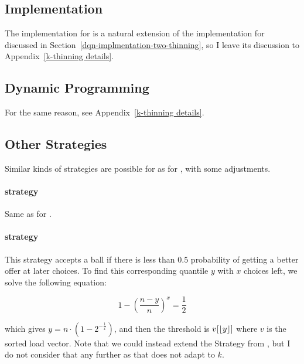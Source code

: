 \section{\KThinning}

\subsection{\DQL Implementation} \label{dqn-implementation-k-thinning}

The \DQL implementation for \KThinning is a natural extension of the implementation for \TwoThinning discussed in Section~\ref{dqn-implmentation-two-thinning}, so I leave its discussion to Appendix~\ref{k-thinning details}.


\subsection{Dynamic Programming} \label{k-thinning-dp}

For the same reason, see Appendix~\ref{k-thinning details}.


\subsection{Other Strategies} \label{k-thinning-otherstrategies}

Similar kinds of strategies are possible for \KThinning as for \TwoThinning, with some adjustments.

\paragraph{\AlwaysAccept strategy} Same as for \TwoThinning.


\paragraph{\Quantile strategy} This strategy accepts a ball if there is less than $0.5$ probability of getting a better offer at later choices. To find this corresponding quantile $y$ with $x$ choices left, we solve the following equation:

\begin{equation} \label{quantilekthinning}
1 - (\frac{n-y}{n})^x = \frac{1}{2}
\end{equation}

which gives $y = n \cdot  (1 - 2^{-\frac{1}{x}})$, and then the threshold is $v[\lfloor y\rfloor]$ where $v$ is the sorted load vector. Note that we could instead extend the \MeanThinning Strategy from \TwoThinning, but I do not consider that any further as that does not adapt to $k$.



